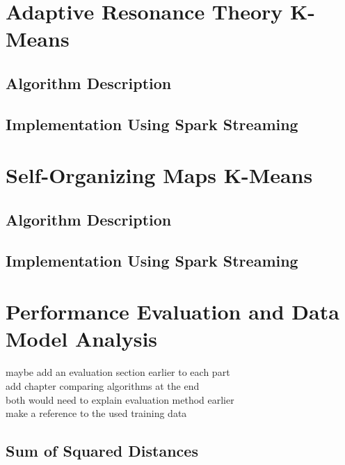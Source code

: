 \documentclass{l4proj}
\begin{document}

\chapter{Adaptive Resonance Theory K-Means}
\label{art}

\section{Algorithm Description}

\section{Implementation Using Spark Streaming}


\chapter{Self-Organizing Maps K-Means}
\label{som}

\section{Algorithm Description}

\section{Implementation Using Spark Streaming}


\chapter{Performance Evaluation and Data Model Analysis}
\label{eval}

maybe add an evaluation section earlier to each part\\
add chapter comparing algorithms at the end\\
both would need to explain evaluation method earlier\\
make a reference to the used training data

\section{Sum of Squared Distances}
\end{document}
